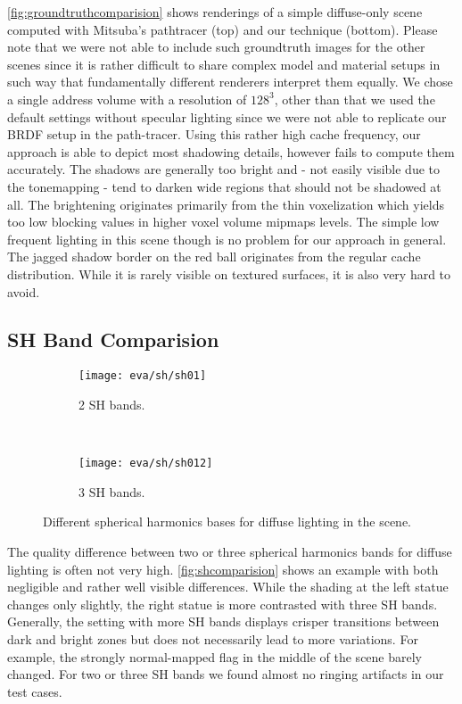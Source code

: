 \documentclass[thesis.tex]{subfiles}
\begin{document}
\autoref{fig:groundtruthcomparision} shows renderings of a simple diffuse-only scene computed with Mitsuba's pathtracer \cite{bib:mitsuba} (top) and our technique (bottom).
Please note that we were not able to include such groundtruth images for the other scenes since it is rather difficult to share complex model and material setups in such way that fundamentally different renderers interpret them equally.
We chose a single address volume with a resolution of $128^3$, other than that we used the default settings without specular lighting since we were not able to replicate our BRDF setup in the path-tracer.
Using this rather high cache frequency, our approach is able to depict most shadowing details, however fails to compute them accurately.
The shadows are generally too bright and - not easily visible due to the tonemapping - tend to darken wide regions that should not be shadowed at all.
The brightening originates primarily from the thin voxelization which yields too low blocking values in higher voxel volume mipmaps levels.
The simple low frequent lighting in this scene though is no problem for our approach in general.
The jagged shadow border on the red ball originates from the regular cache distribution.
While it is rarely visible on textured surfaces, it is also very hard to avoid.

\subsection{SH Band Comparision} \label{sec:eva:shquality}
\begin{figure}[h]
\centering
\begin{subfigure}[b]{0.9\textwidth}
\texttt{[image: eva/sh/sh01]}
\caption{2 SH bands.}
\end{subfigure}
\\
\begin{subfigure}[b]{0.9\textwidth}
\texttt{[image: eva/sh/sh012]}
\caption{3 SH bands.}
\end{subfigure}
\caption{Different spherical harmonics bases for diffuse lighting in the  scene.}
\label{fig:shcomparision}
\end{figure}
The quality difference between two or three spherical harmonics bands for diffuse lighting is often not very high.
\autoref{fig:shcomparision} shows an example with both negligible and rather well visible differences.
While the shading at the left statue changes only slightly, the right statue is more contrasted with three SH bands.
Generally, the setting with more SH bands displays crisper transitions between dark and bright zones but does not necessarily lead to more variations.
For example, the strongly normal-mapped flag in the middle of the scene barely changed.
For two or three SH bands we found almost no ringing artifacts in our test cases.
\end{document}
